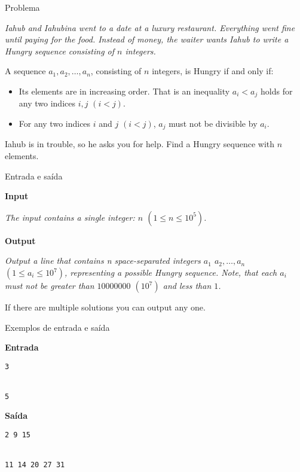 \begin{frame}[fragile]{Problema}

{\it
Iahub and Iahubina went to a date at a luxury restaurant. Everything went fine until paying for the food. Instead of money, the waiter wants Iahub to write a Hungry sequence consisting of $n$ integers.

A sequence $a_1, a_2, \ldots, a_n$, consisting of $n$ integers, is Hungry if and only if:

\begin{itemize}
    \item Its elements are in increasing order. That is an inequality $a_i < a_j$ holds for any two indices $i, j$ $(i < j)$.
    \item For any two indices $i$ and $j$ $(i < j)$, $a_j$ must not be divisible by $a_i$.
\end{itemize}

Iahub is in trouble, so he asks you for help. Find a Hungry sequence with $n$ elements.
}
\end{frame}

\begin{frame}[fragile]{Entrada e saída}

\textbf{Input}

{\it
The input contains a single integer: $n$ $(1 \leq n \leq 10^5)$.
}

\vspace{0.2in}

\textbf{Output}

{\it
Output a line that contains n space-separated integers $a_1$ $a_2, \ldots, a_n$ $(1 \leq a_i \leq 10^7)$, representing a possible Hungry sequence. Note, that each 
$a_i$ must not be greater than $10000000$ $(10^7)$ and less than $1$.

If there are multiple solutions you can output any one.
}

\end{frame}

\begin{frame}[fragile]{Exemplos de entrada e saída}

\begin{minipage}[t]{0.45\textwidth}
\textbf{Entrada}
\begin{verbatim}
3


5
\end{verbatim}
\end{minipage}
\begin{minipage}[t]{0.5\textwidth}
\textbf{Saída}
\begin{verbatim}
2 9 15


11 14 20 27 31
\end{verbatim}
\end{minipage}

\end{frame}


